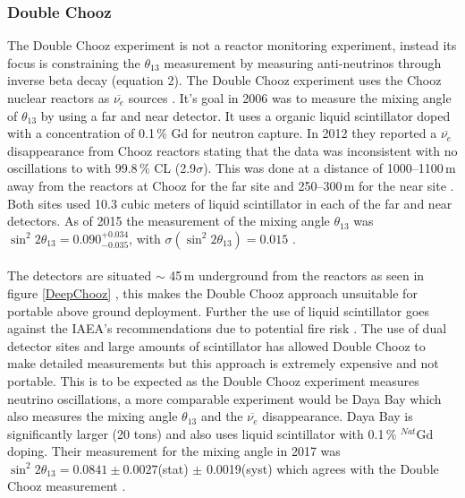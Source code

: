 \documentclass[12pt,a4paper]{article}
\begin{document}
\subsubsection{Double Chooz}
The Double Chooz experiment is not a reactor monitoring experiment, instead its focus is constraining the $\theta_{13}$ measurement by measuring anti-neutrinos through inverse beta decay (equation 2). The Double Chooz experiment uses the Chooz nuclear reactors as $\overline{\nu_e}$ sources \cite{DoubleChooz06}. It's goal in 2006 was to measure the mixing angle of $\theta_{13}$ by using a far and near detector. It uses a organic liquid scintillator doped with a concentration of 0.1\,\% Gd for neutron capture. In 2012 they reported a $\overline{\nu_{e}}$ disappearance from Chooz reactors \cite{DoubleChooz_ve_disapear} stating that the data was inconsistent with no oscillations to with 99.8\,\% CL (2.9$\sigma$). This was done at a distance of 1000--1100\,m away from the reactors at Chooz for the far site and 250--300\,m for the near site \cite{DoubleChooz06}. Both sites used 10.3 cubic meters of liquid scintillator in each of the far and near detectors. As of 2015 the measurement of the mixing angle $\theta_{13}$  was $\sin^2 2 \theta_{13} = 0.090^{+0.034}_{−0.035}$, with $\sigma(\sin^2 2 \theta_{13}) = 0.015$ \cite{Double_Chooz_update}. \\\\
The detectors are situated $\sim$ 45\,m underground from the reactors as seen in figure \ref{DeepChooz} \cite{DoubleChooz06}, this makes the Double Chooz approach unsuitable for portable above ground deployment. Further the use of liquid scintillator goes against the IAEA's recommendations due to potential fire risk \cite{IAEA_bio_fire_report}. The use of dual detector sites and large amounts of scintillator has allowed Double Chooz to make detailed measurements \cite{DoubleChooz_ve_disapear} but this approach is extremely expensive and not portable. This is to be expected as the Double Chooz experiment measures neutrino oscillations, a more comparable experiment would be Daya Bay which also measures the mixing angle $\theta_{13}$ and the $\overline{\nu_e}$ disappearance. Daya Bay is significantly larger (20 tons) and also uses liquid scintillator with 0.1\,\% $^{Nat}$Gd doping. Their measurement for the mixing angle in 2017 was $\sin^2 2\theta_{13} = 0.0841 \pm 0.0027$(stat)  $\pm$ 0.0019(syst) which agrees with the Double Chooz measurement \cite{daya_bay_2017}.
\end{document}
